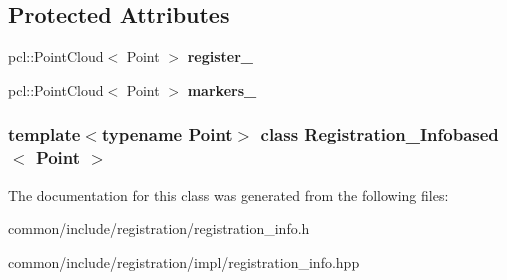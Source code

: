 \subsection*{Protected Attributes}
\begin{DoxyCompactItemize}
\item 
\hypertarget{classRegistration__Infobased_a9a316bf088021afaada65470673cf7c4}{
pcl::PointCloud$<$ Point $>$ {\bfseries register\_\-}}
\label{classRegistration__Infobased_a9a316bf088021afaada65470673cf7c4}

\item 
\hypertarget{classRegistration__Infobased_a093d3ca42b8511a984f81d13346fd318}{
pcl::PointCloud$<$ Point $>$ {\bfseries markers\_\-}}
\label{classRegistration__Infobased_a093d3ca42b8511a984f81d13346fd318}

\end{DoxyCompactItemize}
\subsubsection*{template$<$typename Point$>$ class Registration\_\-Infobased$<$ Point $>$}



The documentation for this class was generated from the following files:\begin{DoxyCompactItemize}
\item 
common/include/registration/registration\_\-info.h\item 
common/include/registration/impl/registration\_\-info.hpp\end{DoxyCompactItemize}
